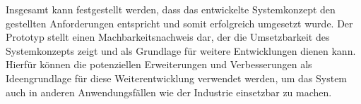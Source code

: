 Insgesamt kann festgestellt werden, dass das entwickelte Systemkonzept den gestellten Anforderungen entspricht und somit erfolgreich umgesetzt wurde.
Der Prototyp stellt einen Machbarkeitsnachweis dar, der die Umsetzbarkeit des Systemkonzepts zeigt und als Grundlage für weitere Entwicklungen dienen kann.
Hierfür können die potenziellen Erweiterungen und Verbesserungen als Ideengrundlage für diese Weiterentwicklung verwendet werden, um das System auch in anderen Anwendungsfällen wie der Industrie einsetzbar zu machen.

